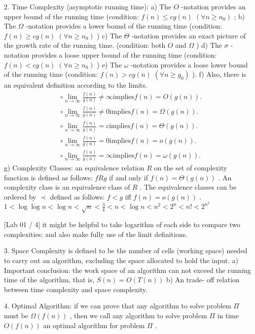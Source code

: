 \documentclass[10pt,a4paper]{article}
\begin{document}
2. Time Complexity (asymptotic running time):
a) The \(O\) -notation provides an upper bound of the running time (condition: \(f(n)\leq cg(n)\) \((\forall n\geq n_0)\) ;
b) The \(\Omega\) -notation provides a lower bound of the running time (condition: \(f(n)\geq cg(n)\) \((\forall n\geq n_0)\) )
c) The \(\Theta\) -notation provides an exact picture of the growth rate of the running time. (condition: both \(O\) and \(\Omega\) )
d) The \(\sigma\) -notation provides a loose upper bound of the running time (condition: \(f(n)< cg(n)\) \((\forall n\geq n_0)\) )
e) The \(\omega\) -notation provides a loose lower bound of the running time (condition: \(f(n) > cg(n)\) \((\forall n\geq g_0)\) ).
f) Also, there is an equivalent definition according to the limits.
\begin{align*}
    & \circ \lim_{n\to \infty}\frac{f(n)}{g(n)}\neq \infty \mathrm{implies}f(n) = O(g(n)).\\
    & \circ \lim_{n\to \infty}\frac{f(n)}{g(n)}\neq 0\mathrm{implies}f(n) = \Omega (g(n)).\\
    & \circ \lim_{n\to \infty}\frac{f(n)}{g(n)} = c\mathrm{implies}f(n) = \Theta (g(n)).\\
    & \circ \lim_{n\to \infty}\frac{f(n)}{g(n)} = 0\mathrm{implies}f(n) = o(g(n)).\\
    & \circ \lim_{n\to \infty}\frac{f(n)}{g(n)} = \infty \mathrm{implies}f(n) = \omega (g(n)).
\end{align*}
g) Complexity Classes: an equivalence relation \(R\) on the set of complexity function is defined as follows: \(fRg\) if and only if \(f(n) = \Theta (g(n))\) . An complexity class is an equivalence class of \(R\) . The equivalence classes can be ordered by \(\prec\) defined as follows: \(f< g\) iff \(f(n) = o(g(n))\) .
\(1< \log \log n< \log n< \sqrt{n} < \frac{3}{4} < n< \log n< n^2 < 2^n < n!< 2^{n^2}\)

[Lab 01 / 4] it might be helpful to take logarithm of each side to compare two complexities; and also make fully use of the limit definitions.

3. Space Complexity is defined to be the number of cells (working space) needed to carry out an algorithm, excluding the space allocated to hold the input.
a) Important conclusion: the work space of an algorithm can not exceed the running time of the algorithm, that is, \(S(n) = O(T(n))\)
b) An trade- off relation between time complexity and space complexity.

4. Optimal Algorithm: if we can prove that any algorithm to solve problem \(\Pi\) must be \(\Omega (f(n))\) , then we call any algorithm to solve problem \(\Pi\) in time \(O(f(n))\) an optimal algorithm for problem \(\Pi\) .
\end{document}
